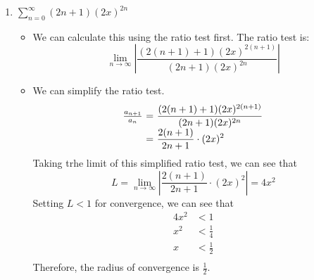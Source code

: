 \documentclass[12pt]{article}
\begin{document}
\begin{enumerate}[leftmargin=\labelsep]
\begin{enumerate}
        \item $\displaystyle{\sum_{n=0}^{\infty} (2n+1)(2x)^{2n}}$
        \begin{itemize}[label={}]
            \item We can calculate this using the ratio test first. The ratio test is:
            \begin{equation*}
                \displaystyle{\lim_{n \to \infty} \left| \frac{(2(n+1)+1)(2x)^{2(n+1)}}{(2n+1)(2x)^{2n}} \right|}
            \end{equation*}
            \item We can simplify the ratio test.
            \begin{equation*}
                \begin{array}[2ex]{r@{~=~}l}
                    \frac{a_{n+1}}{a_n} & \displaystyle{\frac{(2(n+1)+1)(2x)^{2(n+1)}}{(2n+1)(2x)^{2n}}} \\
                    & \displaystyle{\frac{2(n+1)}{2n+1} \cdot (2x)^2} \\
                \end{array}
            \end{equation*}
            Taking trhe limit of this simplified ratio test, we can see that
            \begin{equation*}
                L = \lim_{n \to \infty} \left| \frac{2(n+1)}{2n+1} \cdot (2x)^2 \right| = 4x^2
            \end{equation*}
            Setting $L<1$ for convergence, we can see that
            \begin{equation*}
                \begin{split}
                    4x^2 &< 1 \\
                    x^2 &< \frac{1}{4} \\
                    x &< \frac{1}{2} \\
                \end{split}
            \end{equation*}
            Therefore, the radius of convergence is $\displaystyle{\frac{1}{2}}$.
        \end{itemize}



\end{enumerate}
\end{enumerate}
\end{document}
